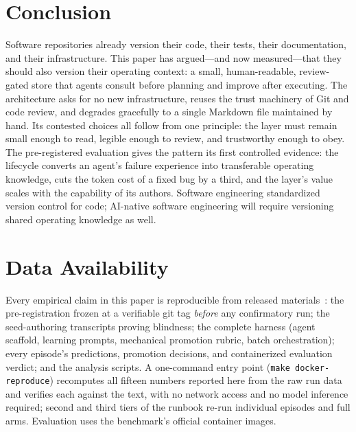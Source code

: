 \documentclass[sigconf,review]{acmart}
\begin{document}
\section{Conclusion}
Software repositories already version their code, their tests, their documentation, and their infrastructure. This paper has argued---and now measured---that they should also version their operating context: a small, human-readable, review-gated store that agents consult before planning and improve after executing. The architecture asks for no new infrastructure, reuses the trust machinery of Git and code review, and degrades gracefully to a single Markdown file maintained by hand. Its contested choices all follow from one principle: the layer must remain small enough to read, legible enough to review, and trustworthy enough to obey. The pre-registered evaluation gives the pattern its first controlled evidence: the lifecycle converts an agent's failure experience into transferable operating knowledge, cuts the token cost of a fixed bug by a third, and the layer's value scales with the capability of its authors. Software engineering standardized version control for code; AI-native software engineering will require versioning shared operating knowledge as well.

\section*{Data Availability}
Every empirical claim in this paper is reproducible from released materials~\cite{artifact}: the pre-registration frozen at a verifiable git tag \emph{before} any confirmatory run; the seed-authoring transcripts proving blindness; the complete harness (agent scaffold, learning prompts, mechanical promotion rubric, batch orchestration); every episode's predictions, promotion decisions, and containerized evaluation verdict; and the analysis scripts. A one-command entry point (\texttt{make docker-reproduce}) recomputes all fifteen numbers reported here from the raw run data and verifies each against the text, with no network access and no model inference required; second and third tiers of the runbook re-run individual episodes and full arms. Evaluation uses the benchmark's official container images.
\end{document}
